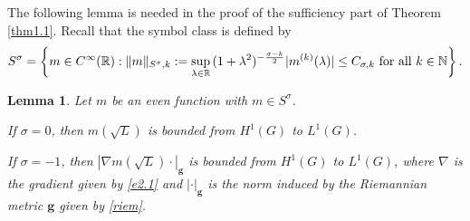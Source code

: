 \documentclass[a4paper,12pt]{amsart}
\numberwithin{equation}{section}
\newtheorem{lemma}[theorem]{Lemma}
\theoremstyle{definition}
\theoremstyle{remark}
\numberwithin{theorem}{section}
\newcommand{\R}{\mathbb{R}}
\newcommand{\g}{\mathbf{g}}
\begin{document}
The following lemma is needed in the proof of the sufficiency part of Theorem \ref{thm1.1}. Recall that the symbol class is defined by
\begin{align*}
S^\sigma=\left\{m\in C^\infty(\R):\|m\|_{S^\sigma,k}:=\sup_{\lambda\in\R}\,(1+\lambda^2)^{-{\sigma-k\over 2}}|m^{(k)}(\lambda)|\leq C_{\sigma,k}\text{ for all }k\in \mathbb{N}\right\}.
\end{align*}
\begin{lemma}\label{thm3.2}
Let $m$ be an even function with $m\in S^\sigma$.
\begin{asparaenum}[\rm (a)]
\item If $\sigma=0$, then $m(\sqrt{L})$ is bounded from $H^1(G)$ to $L^1(G)$.
\item If $\sigma=-1$, then $|\nabla m(\sqrt{L})\cdot|_{\mathbf{g}}$ is bounded from $H^1(G)$ to $L^1(G)$, where $\nabla$ is the gradient given by \eqref{e2.1} and $|\cdot|_{\mathbf{g}}$ is the norm induced by the Riemannian metric $\g$ given by \eqref{riem}.
\end{asparaenum}
\end{lemma}
\end{document}
